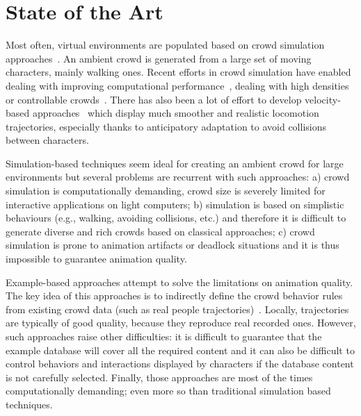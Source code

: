 \section{State of the Art}
\label{sec:star}

Most often, virtual environments are populated based on crowd simulation approaches~\cite{ThalmannBook:2013}.
An ambient crowd is generated from a large set of moving characters, mainly walking ones.
Recent efforts in crowd simulation have enabled dealing with improving computational performance~\cite{PettreCAVW:2006,Treuille:2006}, dealing with high densities~\cite{Narain:2009} or controllable crowds~\cite{Guy:2009}.
There has also been a lot of effort to develop velocity-based approaches~\cite{Paris:2007,VanDenBerg:2008} which display much smoother and realistic locomotion trajectories, especially thanks to anticipatory adaptation to avoid collisions between characters.

Simulation-based techniques seem ideal for creating an ambient crowd for large environments but several problems are recurrent with such approaches:
a) crowd simulation is computationally demanding, crowd size is severely limited for interactive applications on light computers;
b) simulation is based on simplistic behaviours (e.g., walking, avoiding collisions, etc.) and therefore it is difficult to generate diverse and rich crowds based on classical approaches;
c) crowd simulation is prone to animation artifacts or deadlock situations and it is thus impossible to guarantee animation quality. 

Example-based approaches attempt to solve the limitations on animation quality.
The key idea of this approaches is to indirectly define the crowd behavior rules from existing crowd data (such as real people trajectories)~\cite{Lerner:2007,Ju:2010,Charalambous:2014}.
Locally, trajectories are typically of good quality, because they reproduce real recorded ones.
However, such approaches raise other difficulties: it is difficult to guarantee that the example database will cover all the required content and it can also be difficult to control behaviors and interactions displayed by characters if the database content is not carefully selected.
Finally, those approaches are most of the times computationally demanding; even more so than traditional simulation based techniques.

